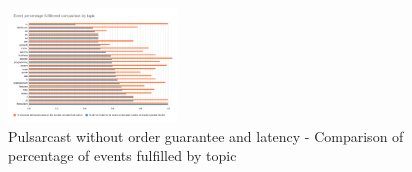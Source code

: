 \begin{figure}[!htb]
  \centering
  \includegraphics[width=0.4\textwidth]{../images/graph-pulsarcast-latency-event-percentage-fulfillment-comparison.png}
  \caption{Pulsarcast without order guarantee and latency - Comparison of percentage of events fulfilled by topic}
  \label{fig:graph-pulsarcast-latency-event-percentage-fulfillment-comparison}
\end{figure}
